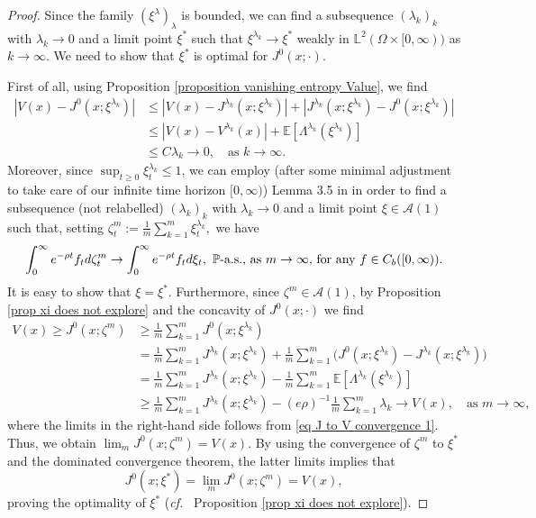 \documentclass[11pt]{amsart}
\theoremstyle{plain}
\def \dd{{\rm d}}
\def \E{{\mathbb{E}}}
\numberwithin{equation}{section}
\begin{document}
\begin{proof} 
Since the family $(\xi^\lambda)_\lambda$ is bounded,  we can find a subsequence $(\lambda_k)_k$  with $\lambda_k \to 0$   and a limit point $\xi^*$ such that
$\xi^{\lambda_k} \to \xi^*$ weakly in $\mathbb L ^2 (\Omega \times [0,\infty) )$ as $k \to \infty$.
We need to show that $\xi^*$ is optimal for $J^0(x;\cdot)$. 

First of all, using Proposition \ref{proposition vanishing entropy Value}, we find
\begin{equation}\label{eq J to V convergence 1}
\begin{aligned}
 |V(x) - J^0(x; \xi^{\lambda_k} ) | 
 & \leq |V(x)- J^{\lambda_k} (x; \xi^{\lambda_k} ) | + | J^{\lambda_k} (x; \xi^{\lambda_k} ) - J^0(x; \xi^{\lambda_k} )| \\
 & \leq |V(x)- V^{\lambda_k} (x ) | + \E [ \Lambda ^{\lambda_k}  (\xi^{\lambda_k}) ] \\
 & \leq C {\lambda_k} \to 0, \quad  \text{as $k\to \infty$.}
\end{aligned}
\end{equation}
Moreover, since $\sup_{t \geq 0} \xi^{\lambda_k}_t \leq 1$, we can employ (after some minimal adjustment to take care of our infinite time horizon $[0,\infty)$) Lemma 3.5 in \cite{K} in order to find a subsequence (not relabelled)  $(\lambda_k)_k$ with $\lambda_k \to 0$ and a limit point $\xi \in \mathcal A (1)$ such that, setting
$
\zeta^m_t := \frac1m \sum_{k=1}^m \xi^{\lambda_k}_t,
$
we have
$$
\int_0^\infty e^{-\rho t} f_t \dd\zeta^m_t \to \int_0^\infty e^{-\rho t} f_t \dd\xi_t,  \ \mathbb P \text{-a.s., as $m \to \infty$, for any $f \in C_b([0,\infty))$.}
$$
It is easy to show that $\xi = \xi^*$. 
Furthermore, since $\zeta^m \in \mathcal A (1)$, by Proposition  \ref{prop xi does not explore} and the concavity of $J^0 (x;\cdot)$ we find
$$
\begin{aligned}
    V(x) \geq J^0 (x; \zeta^m) &\geq \frac{1}{m} \sum_{k=1}^m J^0(x;\xi^{\lambda_k}) \\
    & = \frac{1}{m} \sum_{k=1}^m J^{\lambda _k} (x;\xi^{\lambda_k}) +  \frac{1}{m} \sum_{k=1}^m \big(J^{0} (x;\xi^{\lambda_k}) - J^{\lambda _k} (x;\xi^{\lambda_k}) \big) \\
    & = \frac{1}{m} \sum_{k=1}^m J^{\lambda _k} (x;\xi^{\lambda_k}) -  \frac{1}{m} \sum_{k=1}^m \E [\Lambda^{\lambda_k} (\xi^{\lambda_k})] \\
     & \geq \frac{1}{m} \sum_{k=1}^m J^{\lambda _k} (x;\xi^{\lambda_k}) -  (e \rho)^{-1} \frac{1}{m} \sum_{k=1}^m {\lambda_k} \to V(x), \quad \text{as $m\to \infty$,}
\end{aligned}
$$
where the limits in the right-hand side follows from \eqref{eq J to V convergence 1}.
Thus, we obtain
$
\lim_{m} J^0(x;\zeta^m) = V(x). 
$  
By using the convergence of $\zeta^m $ to $ \xi^*$ and the dominated convergence theorem, the latter limits implies that
$$
J^0(x;\xi^*) = \lim_{m} J^0(x;\zeta^m) = V(x),
$$
proving the optimality of $\xi^*$ ({\it cf.} \ Proposition \ref{prop xi does not explore}).
 

\end{proof}
\end{document}
